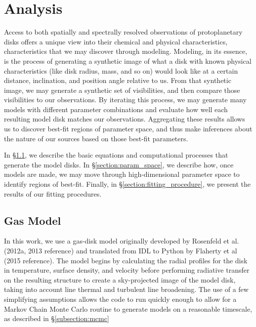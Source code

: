 \chapter{Analysis}
\label{chap:analysis}

Access to both spatially and spectrally resolved observations of protoplanetary disks offers a unique view into their chemical and physical characteristics, characteristics that we may discover through modeling. Modeling, in its essence, is the process of generating a synthetic image of what a disk with known physical characteristics (like disk radius, mass, and so on) would look like at a certain distance, inclination, and position angle relative to us. From that synthetic image, we may generate a synthetic set of visibilities, and then compare those visibilities to our observations. By iterating this process, we may generate many models with different parameter combinations and evaluate how well each resulting model disk matches our observations. Aggregating these results allows us to discover best-fit regions of parameter space, and thus make inferences about the nature of our sources based on those best-fit parameters.


In \S\ref{section:gas_model}, we describe the basic equations and computational processes that generate the model disks. In \S\ref{section:param_space}, we describe how, once models are made, we may move through high-dimensional parameter space to identify regions of best-fit. Finally, in \S\ref{section:fitting_procedure}, we present the results of our fitting procedures.


\section{Gas Model}
\label{section:gas_model}

In this work, we use a gas-disk model originally developed by Rosenfeld et al. (2012a, 2013 reference) and translated from IDL to Python by Flaherty et al (2015 reference). The model begins by calculating the radial profiles for the disk in temperature, surface density, and velocity before performing radiative transfer on the resulting structure to create a sky-projected image of the model disk, taking into account line thermal and turbulent line broadening. The use of a few simplifying assumptions allows the code to run quickly enough to allow for a Markov Chain Monte Carlo routine to generate models on a reasonable timescale, as described in \S\ref{subsection:mcmc}



